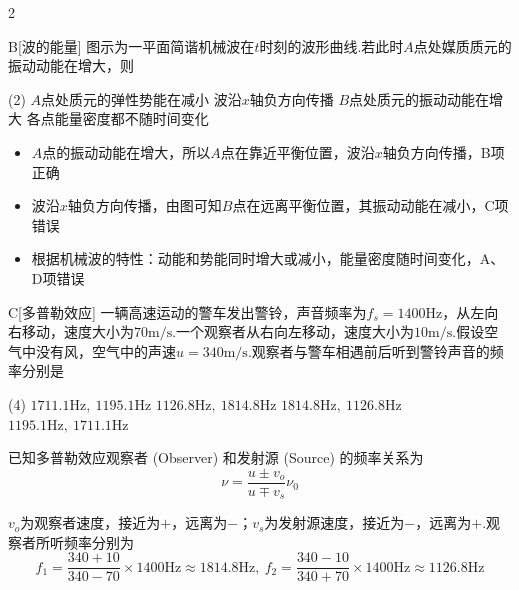 \begin{paracol}{2}
\begin{choice}{B}[波的能量]
    图示为一平面简谐机械波在$t$时刻的波形曲线.若此时$A$点处媒质质元的振动动能在增大，则
    \begin{tasks}(2)
        \task $A$点处质元的弹性势能在减小
        \task 波沿$x$轴负方向传播
        \task $B$点处质元的振动动能在增大
        \task 各点能量密度都不随时间变化
    \end{tasks}
\end{choice}
\switchcolumn\centering
\vfill
\vfill
\end{paracol}
\begin{solution}
    \begin{itemize}
        \item $A$点的振动动能在增大，所以$A$点在靠近平衡位置，波沿$x$轴负方向传播，B项正确
        \item 波沿$x$轴负方向传播，由图可知$B$点在远离平衡位置，其振动动能在减小，C项错误
        \item 根据机械波的特性：动能和势能同时增大或减小，能量密度随时间变化，A、D项错误
    \end{itemize}
\end{solution}

\begin{choice}{C}[多普勒效应]
    一辆高速运动的警车发出警铃，声音频率为$f_s=1400\mathrm{Hz}$，从左向右移动，速度大小为$70\mathrm{m/s}$.一个观察者从右向左移动，速度大小为$10\mathrm{m/s}$.假设空气中没有风，空气中的声速$u=340\mathrm{m/s}$.观察者与警车相遇前后听到警铃声音的频率分别是
\begin{tasks}(4)
    \task $1711.1\mathrm{Hz},\ 1195.1\mathrm{Hz}$
    \task $1126.8\mathrm{Hz},\ 1814.8\mathrm{Hz}$
    \task $1814.8\mathrm{Hz},\ 1126.8\mathrm{Hz}$
    \task $1195.1\mathrm{Hz},\ 1711.1\mathrm{Hz}$
\end{tasks}
\end{choice}
\begin{solution}
    已知多普勒效应观察者 (Observer) 和发射源 (Source) 的频率关系为
    \[\nu=\frac{u\pm v_o}{u\mp v_s}\nu_0\]

    $v_o$为观察者速度，接近为$+$，远离为$-$；$v_s$为发射源速度，接近为$-$，远离为$+$.观察者所听频率分别为
    \[f_1=\frac{340+10}{340-70}\times 1400\mathrm{Hz}\approx 1814.8\mathrm{Hz},\ f_2=\frac{340-10}{340+70}\times 1400\mathrm{Hz}\approx 1126.8\mathrm{Hz}\]
\end{solution}

